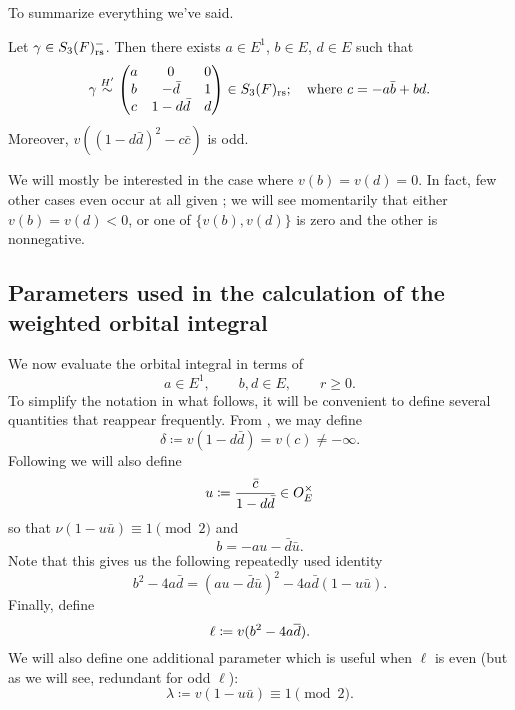 To summarize everything we've said.
\begin{lemma}
  \label{lem:S3_abcd}
  Let $\gamma \in S_3(F)_{\mathrm{rs}}^-$.
  Then there exists $a \in E^1$, $b \in E$, $d \in E$ such that
  \[ \gamma \overset{H'}{\sim}
    \begin{pmatrix}
      a & 0 & 0 \\
      b & - \bar d & 1 \\
      c & 1 - d \bar d & d
    \end{pmatrix}
    \in S_3(F)_{\mathrm{rs}}; \quad \text{where $c = -a \bar b + b d$}. \]
  Moreover, $v\left( (1-d \bar d)^2 - c \bar c \right)$ is odd.
\end{lemma}

We will mostly be interested in the case where $v(b) = v(d) = 0$.
In fact, few other cases even occur at all given ;
we will see momentarily that either $v(b) = v(d) < 0$,
or one of $\{v(b), v(d)\}$ is zero and the other is nonnegative.

\subsection{Parameters used in the calculation of the weighted orbital integral}
\label{sec:param_orbital0}

We now evaluate the orbital integral in terms of
\[ a \in E^1, \qquad b, d \in E, \qquad r \ge 0. \]
To simplify the notation in what follows,
it will be convenient to define several quantities that reappear frequently.
From , we may define
\begin{equation}
  \delta \coloneqq v(1-d \bar d) = v(c) \neq -\infty.
  \label{eq:delta}
\end{equation}
Following \cite[Equation (4.3)]{ref:AFL} we will also define
\begin{equation}
  u \coloneqq \frac{\bar c}{1-d \bar d} \in O_E^\times
  \label{eq:u}
\end{equation}
so that $\nu(1-u \bar u) \equiv 1 \pmod 2$ and
\begin{equation}
  b = -au - \bar{d} \bar{u}.
  \label{eq:b}
\end{equation}
Note that this gives us the following repeatedly used identity
\begin{equation}
  b^2-4a\bar d = (au-\bar d \bar u)^2 - 4a\bar d(1-u\bar u).
  \label{eq:dos}
\end{equation}
Finally, define
\begin{equation}
  \ell \coloneqq v(b^2 - 4 a \overline d).
  \label{eq:ell}
\end{equation}
We will also define one additional parameter which is useful when $\ell$ is even
(but as we will see, redundant for odd $\ell$):
\begin{equation}
  \lambda \coloneqq v(1-u \bar u) \equiv 1 \pmod 2.
  \label{eq:lambda}
\end{equation}

